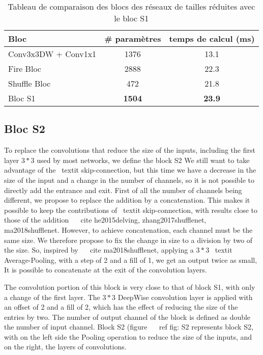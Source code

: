\documentclass[letterpaper, 10 pt, conference]{ieeeconf}  %
\begin{document}
\begin{table}[h]
\centering
\begin{tabular}{|l|c|c|}
\hline
Bloc & \# paramètres & temps de calcul (ms) \\
\hline
\hline
Conv3x3DW + Conv1x1 & 1376 & 13.1 \\
\hline
Fire Bloc & 2888 & 22.3 \\
\hline
Shuffle Bloc & 472 & 21.8 \\
\hline
Bloc S1 & \textbf{1504} & \textbf{23.9}\\
\hline
\end{tabular}
\caption{Tableau de comparaison des blocs des réseaux de tailles réduites avec le bloc S1}
\label{tab:blocS1}
\end{table}



\subsection{Bloc S2}
\label{sec:S2}

To replace the convolutions that reduce the size of the inputs, including the first layer $ 3 * 3 $ used by most networks, we define the block S2
We still want to take advantage of the \ textit {skip-connection}, but this time we have a decrease in the size of the input and a change in the number of channels, so it is not possible to directly add the entrance and exit.
First of all the number of channels being different, we propose to replace the addition by a concatenation.
This makes it possible to keep the contributions of \ textit {skip-connection}, with results close to those of the addition ~ \ cite {he2015delving, zhang2017shufflenet, ma2018shufflenet}.
However, to achieve concatenation, each channel must be the same size.
We therefore propose to fix the change in size to a division by two of the size.
So, inspired by ~ \ cite {ma2018shufflenet}, applying a $ 3 * 3 $ \ textit {Average-Pooling}, with a step of 2 and a fill of 1, we get an output twice as small, It is possible to concatenate at the exit of the convolution layers.

The convolution portion of this block is very close to that of block S1, with only a change of the first layer.
The $ 3 * 3 $ DeepWise convolution layer is applied with an offset of 2 and a fill of 2, which has the effect of reducing the size of the entries by two.
The number of output channel of the block is defined as double the number of input channel.
Block S2 (figure ~ \ ref {fig: S2} represents block S2, with on the left side the Pooling operation to reduce the size of the inputs, and on the right, the layers of convolutions.
\end{document}
